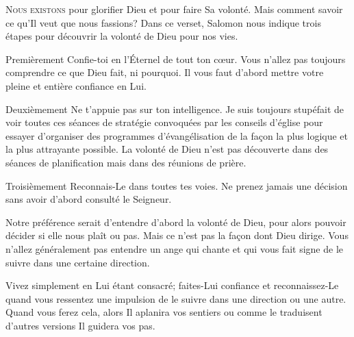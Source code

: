


\lettrine{N}{ous existons} pour glorifier Dieu et pour faire Sa volonté.
 Mais comment savoir ce qu'Il veut que nous fassions?
 Dans ce verset, Salomon nous indique trois étapes pour découvrir
 la volonté de Dieu pour nos vies. 

Premièrement\frcolon{} \Og Confie-toi en l'Éternel de tout ton c\oe{}ur. \Fg{}
 Vous n'allez pas toujours comprendre ce que Dieu fait, ni pourquoi.
 Il vous faut d'abord mettre votre pleine et entière confiance en Lui. 

Deuxièmement\frcolon{} \Og Ne t'appuie pas sur ton intelligence. \Fg{}
 Je suis toujours stupéfait de voir toutes ces séances de stratégie
 convoquées par les conseils d'église pour essayer d'organiser
 des programmes d'évangélisation de la fa\c{c}on la plus logique
 et la plus attrayante possible.
 La volonté de Dieu n'est pas découverte dans des séances
 de planification mais dans des réunions de prière. 

Troisièmement\frcolon{} \Og Reconnais-Le dans toutes tes voies. \Fg{}
 Ne prenez jamais une décision sans avoir d'abord consulté le Seigneur. 


Notre préférence serait d'entendre d'abord la volonté de Dieu, 
 pour alors pouvoir décider si elle nous plaît ou pas. 
 Mais ce n'est pas la fa\c{c}on dont Dieu dirige.
 Vous n'allez généralement pas entendre un ange qui chante
 et qui vous fait signe de le suivre dans une certaine direction. 

Vivez simplement en Lui étant consacré; faites-Lui confiance
 et reconnaissez-Le quand vous ressentez une impulsion de le suivre
 dans une direction ou une autre.
 Quand vous ferez cela, alors \Og Il aplanira vos sentiers \Fg{}
 ou comme le traduisent d'autres versions\frcolon{} 
 \Og Il guidera vos pas. \Fg{}

\dvrule



